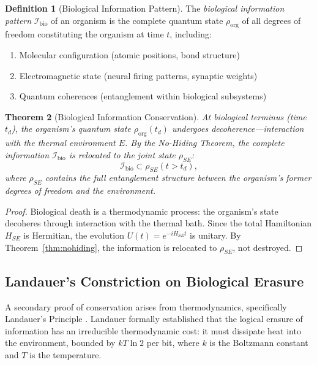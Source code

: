\documentclass[12pt, a4paper]{article}
\theoremstyle{plain}
\newtheorem{theorem}{Theorem}[section]
\theoremstyle{definition}
\newtheorem{definition}[theorem]{Definition}
\theoremstyle{remark}
\begin{document}
\begin{definition}[Biological Information Pattern]\label{def:bio}
  The \emph{biological information pattern} $\mathcal{I}_{\text{bio}}$
  of an organism is the complete quantum state $\rho_{\text{org}}$
  of all degrees of freedom constituting the organism at time $t$,
  including:
  \begin{enumerate}[label=(\alph*)]
    \item Molecular configuration (atomic positions, bond structure)
    \item Electromagnetic state (neural firing patterns, synaptic weights)
    \item Quantum coherences (entanglement within biological subsystems)
  \end{enumerate}
\end{definition}

\begin{theorem}[Biological Information Conservation]\label{thm:biocons}
  At biological terminus (time $t_d$), the organism's quantum state
  $\rho_{\text{org}}(t_d)$ undergoes decoherence---interaction with the
  thermal environment $E$. By the No-Hiding Theorem, the complete
  information $\mathcal{I}_{\text{bio}}$ is relocated to the joint
  state $\rho_{SE}$:
  \begin{equation}
    \mathcal{I}_{\text{bio}} \subset \rho_{SE}(t > t_d),
  \end{equation}
  where $\rho_{SE}$ contains the full entanglement structure between
  the organism's former degrees of freedom and the environment.
\end{theorem}

\begin{proof}
  Biological death is a thermodynamic process: the organism's state
  decoheres through interaction with the thermal bath. Since the total
  Hamiltonian $H_{SE}$ is Hermitian, the evolution $U(t) = e^{-iH_{SE}t}$
  is unitary. By Theorem~\ref{thm:nohiding}, the information is relocated
  to $\rho_{SE}$, not destroyed. \qedhere
\end{proof}

\subsection{Landauer's Constriction on Biological Erasure}

A secondary proof of conservation arises from thermodynamics, specifically Landauer's Principle \citep{Landauer1961}. Landauer formally established that the logical erasure of information has an irreducible thermodynamic cost: it must dissipate heat into the environment, bounded by $kT \ln 2$ per bit, where $k$ is the Boltzmann constant and $T$ is the temperature.
\end{document}
